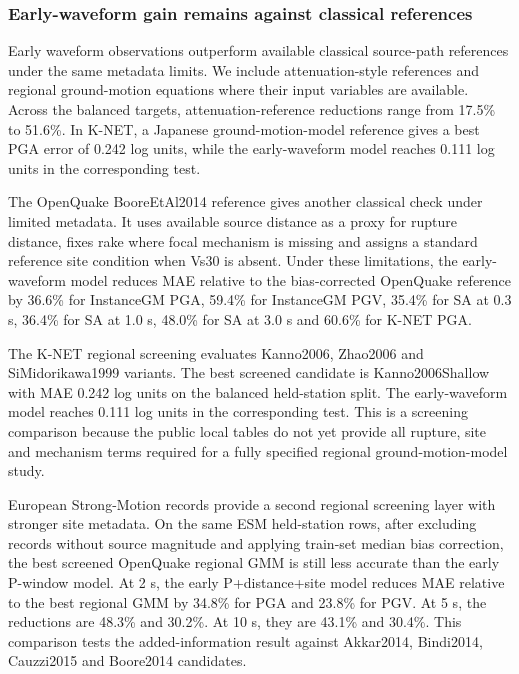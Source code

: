 \documentclass[
  10pt,
]{article}
\begin{document}
\subsubsection{Early-waveform gain remains against classical
references}\label{early-waveform-gain-remains-against-classical-references}

Early waveform observations outperform available classical source-path
references under the same metadata limits. We include attenuation-style
references and regional ground-motion equations where their input
variables are available. Across the balanced targets,
attenuation-reference reductions range from 17.5\% to 51.6\%. In K-NET,
a Japanese ground-motion-model reference gives a best PGA error of 0.242
log units, while the early-waveform model reaches 0.111 log units in the
corresponding test.

The OpenQuake BooreEtAl2014 reference gives another classical check
under limited metadata. It uses available source distance as a proxy for
rupture distance, fixes rake where focal mechanism is missing and
assigns a standard reference site condition when Vs30 is absent. Under
these limitations, the early-waveform model reduces MAE relative to the
bias-corrected OpenQuake reference by 36.6\% for InstanceGM PGA, 59.4\%
for InstanceGM PGV, 35.4\% for SA at 0.3 s, 36.4\% for SA at 1.0 s,
48.0\% for SA at 3.0 s and 60.6\% for K-NET PGA.

The K-NET regional screening evaluates Kanno2006, Zhao2006 and
SiMidorikawa1999 variants. The best screened candidate is
Kanno2006Shallow with MAE 0.242 log units on the balanced held-station
split. The early-waveform model reaches 0.111 log units in the
corresponding test. This is a screening comparison because the public
local tables do not yet provide all rupture, site and mechanism terms
required for a fully specified regional ground-motion-model study.

European Strong-Motion records provide a second regional screening layer
with stronger site metadata. On the same ESM held-station rows, after
excluding records without source magnitude and applying train-set median
bias correction, the best screened OpenQuake regional GMM is still less
accurate than the early P-window model. At 2 s, the early
P+distance+site model reduces MAE relative to the best regional GMM by
34.8\% for PGA and 23.8\% for PGV. At 5 s, the reductions are 48.3\% and
30.2\%. At 10 s, they are 43.1\% and 30.4\%. This comparison tests the
added-information result against Akkar2014, Bindi2014, Cauzzi2015 and
Boore2014 candidates.
\end{document}
